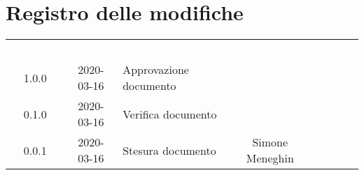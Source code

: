 \section*{Registro delle modifiche}
{
	\centering
	\begin{longtable}{ c c  C{4cm}  c  c }
		\textcolor{white}{\textbf{Versione}} & \textcolor{white}{\textbf{Data}} & \textcolor{white}{\textbf{Descrizione}} & \textcolor{white}{\textbf{Nominativo}} & \textcolor{white}{\textbf{Ruolo}}\\		
		1.0.0 & 2020-03-16 & Approvazione documento &  &\RdP{}\\		
		0.1.0 & 2020-03-16 & Verifica documento &  &\ver{}\\		
		0.0.1 & 2020-03-16 & Stesura documento & Simone Meneghin &\reda{}\\		
		
	\end{longtable}

}